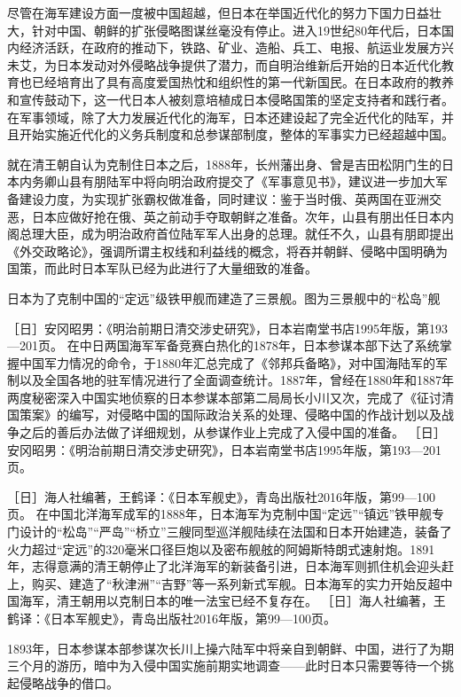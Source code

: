 \documentclass[12pt,UTF8]{ctexbook}
\begin{document}
尽管在海军建设方面一度被中国超越，但日本在举国近代化的努力下国力日益壮大，针对中国、朝鲜的扩张侵略图谋丝毫没有停止。进入19世纪80年代后，日本国内经济活跃，在政府的推动下，铁路、矿业、造船、兵工、电报、航运业发展方兴未艾，为日本发动对外侵略战争提供了潜力，而自明治维新后开始的日本近代化教育也已经培育出了具有高度爱国热忱和组织性的第一代新国民。在日本政府的教养和宣传鼓动下，这一代日本人被刻意培植成日本侵略国策的坚定支持者和践行者。在军事领域，除了大力发展近代化的海军，日本还建设起了完全近代化的陆军，并且开始实施近代化的义务兵制度和总参谋部制度，整体的军事实力已经超越中国。

就在清王朝自认为克制住日本之后，1888年，长州藩出身、曾是吉田松阴门生的日本内务卿山县有朋陆军中将向明治政府提交了《军事意见书》，建议进一步加大军备建设力度，为实现扩张霸权做准备，同时建议：鉴于当时俄、英两国在亚洲交恶，日本应做好抢在俄、英之前动手夺取朝鲜之准备。次年，山县有朋出任日本内阁总理大臣，成为明治政府首位陆军军人出身的总理。就任不久，山县有朋即提出《外交政略论》，强调所谓主权线和利益线的概念，将吞并朝鲜、侵略中国明确为国策，而此时日本军队已经为此进行了大量细致的准备。


日本为了克制中国的“定远”级铁甲舰而建造了三景舰。图为三景舰中的“松岛”舰

［日］安冈昭男：《明治前期日清交涉史研究》，日本岩南堂书店1995年版，第193—201页。
在中日两国海军军备竞赛白热化的1878年，日本参谋本部下达了系统掌握中国军力情况的命令，于1880年汇总完成了《邻邦兵备略》，对中国海陆军的军制以及全国各地的驻军情况进行了全面调查统计。1887年，曾经在1880年和1887年两度秘密深入中国实地侦察的日本参谋本部第二局局长小川又次，完成了《征讨清国策案》的编写，对侵略中国的国际政治关系的处理、侵略中国的作战计划以及战争之后的善后办法做了详细规划，从参谋作业上完成了入侵中国的准备。 ［日］安冈昭男：《明治前期日清交涉史研究》，日本岩南堂书店1995年版，第193—201页。

［日］海人社编著，王鹤译：《日本军舰史》，青岛出版社2016年版，第99—100页。
在中国北洋海军成军的1888年，日本海军为克制中国“定远”“镇远”铁甲舰专门设计的“松岛”“严岛”“桥立”三艘同型巡洋舰陆续在法国和日本开始建造，装备了火力超过“定远”的320毫米口径巨炮以及密布舰舷的阿姆斯特朗式速射炮。1891年，志得意满的清王朝停止了北洋海军的新装备引进，日本海军则抓住机会迎头赶上，购买、建造了“秋津洲”“吉野”等一系列新式军舰。日本海军的实力开始反超中国海军，清王朝用以克制日本的唯一法宝已经不复存在。 ［日］海人社编著，王鹤译：《日本军舰史》，青岛出版社2016年版，第99—100页。

1893年，日本参谋本部参谋次长川上操六陆军中将亲自到朝鲜、中国，进行了为期三个月的游历，暗中为入侵中国实施前期实地调查——此时日本只需要等待一个挑起侵略战争的借口。
\end{document}
